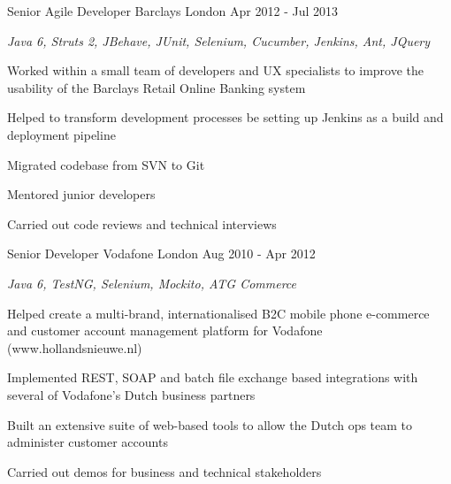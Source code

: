 \begin{cventries}
  \cventry
    {Senior Agile Developer} %
    {Barclays} %
    {London} %
    {Apr 2012 - Jul 2013} %
    {
      \begin{cvitems} %
        \item {\itshape{Java 6, Struts 2, JBehave, JUnit, Selenium, Cucumber, Jenkins, Ant, JQuery}}
        \item {Worked within a small team of developers and UX specialists to improve the usability of the Barclays Retail Online Banking system}
        \item {Helped to transform development processes be setting up Jenkins as a build and deployment pipeline}
        \item {Migrated codebase from SVN to Git}
        \item {Mentored junior developers}
        \item {Carried out code reviews and technical interviews}
      \end{cvitems}
    }

  \cventry
    {Senior Developer} %
    {Vodafone} %
    {London} %
    {Aug 2010 - Apr 2012} %
    {
      \begin{cvitems} %
        \item {\itshape{Java 6, TestNG, Selenium, Mockito, ATG Commerce}}
        \item {Helped create a multi-brand, internationalised B2C mobile phone e-commerce and customer account management platform for Vodafone (www.hollandsnieuwe.nl)}
        \item {Implemented REST, SOAP and batch file exchange based integrations with several of Vodafone’s Dutch business partners}
        \item {Built an extensive suite of web-based tools to allow the Dutch ops team to administer customer accounts}
        \item {Carried out demos for business and technical stakeholders}
      \end{cvitems}
    }


\end{cventries}
